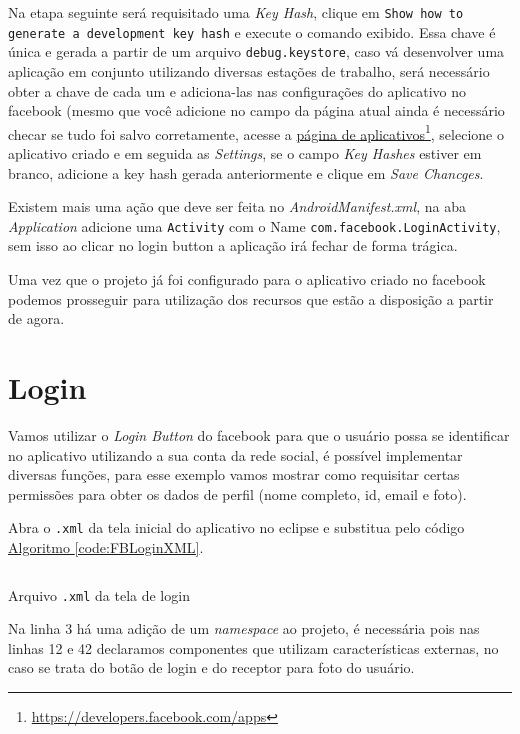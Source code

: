 \documentclass[a4paper,12pt,brazil,oneside]{book}
\begin{document}
	Na etapa seguinte será requisitado uma \emph{Key Hash}, clique em \texttt{Show how to generate a development key hash} e execute o comando exibido. Essa chave é única e gerada a partir de um arquivo \texttt{debug.keystore}, caso vá desenvolver uma aplicação em conjunto utilizando diversas estações de trabalho, será necessário obter a chave de cada um e adiciona-las nas configurações do aplicativo no facebook (mesmo que você adicione no campo da página atual ainda é necessário checar se tudo foi salvo corretamente, acesse a \href{https://developers.facebook.com/apps}{página de aplicativos}\footnote{\href{https://developers.facebook.com/apps}{https://developers.facebook.com/apps}}, selecione o aplicativo criado e em seguida as \emph{Settings}, se o campo \emph{Key Hashes} estiver em branco, adicione a key hash gerada anteriormente e clique em \emph{Save Chancges}.
	
	Existem mais uma ação que deve ser feita no \emph{AndroidManifest.xml}, na aba \emph{Application} adicione uma \texttt{Activity} com o Name \texttt{com.facebook.LoginActivity}, sem isso ao clicar no login button a aplicação irá fechar de forma trágica.
		
	Uma vez que o projeto já foi configurado para o aplicativo criado no facebook podemos prosseguir para utilização dos recursos que estão a disposição a partir de agora.
	
\newpage
	
\section{Login}
	Vamos utilizar o \emph{Login Button} do facebook para que o usuário possa se identificar no aplicativo utilizando a sua conta da rede social, é possível implementar diversas funções, para esse exemplo vamos  mostrar como requisitar certas permissões para obter os dados de perfil (nome completo, id, email e foto).
	
	Abra o \texttt{.xml} da tela inicial do aplicativo no eclipse e substitua pelo código \hyperref[code:FBLoginXML]{Algoritmo \ref*{code:FBLoginXML}}.
	
	\begin{listing}[H]
	\inputminted[linenos=true,fontsize=\small,frame=lines, framesep=2mm, tabsize=2,numbersep=5pt]{xml}{src/facebook/loginMainXML.xml}
	\caption{Arquivo \texttt{.xml} da tela de login}
	\label{code:FBLoginXML}
	\end{listing} 	
	
	Na linha 3 há uma adição de um \emph{namespace} ao projeto, é necessária pois nas linhas 12 e 42 declaramos componentes que utilizam características externas, no caso se trata do botão de login e do receptor para foto do usuário.
	
\end{document}
